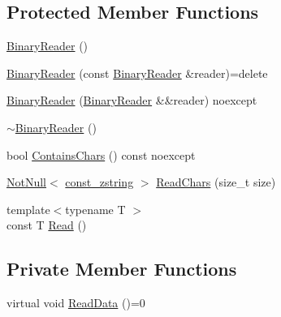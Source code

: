 \subsection*{Protected Member Functions}
\begin{DoxyCompactItemize}
\item 
\mbox{\hyperlink{classmage_1_1_binary_reader_aab82579cef4f2f022273cf1adfcc8497}{Binary\+Reader}} ()
\item 
\mbox{\hyperlink{classmage_1_1_binary_reader_a8c1ff948f1d056439f3d8cc37d7f507c}{Binary\+Reader}} (const \mbox{\hyperlink{classmage_1_1_binary_reader}{Binary\+Reader}} \&reader)=delete
\item 
\mbox{\hyperlink{classmage_1_1_binary_reader_a520841747b74b4b0e95f8d9b595492fa}{Binary\+Reader}} (\mbox{\hyperlink{classmage_1_1_binary_reader}{Binary\+Reader}} \&\&reader) noexcept
\item 
\mbox{\hyperlink{classmage_1_1_binary_reader_a42e6c31bc53f5214675f845756b5a404}{$\sim$\+Binary\+Reader}} ()
\item 
bool \mbox{\hyperlink{classmage_1_1_binary_reader_af68b85b30fbe8b5f2d4720163a658ab5}{Contains\+Chars}} () const noexcept
\item 
\mbox{\hyperlink{namespacemage_a8769f9d670d6b585ea306cb1062af94b}{Not\+Null}}$<$ \mbox{\hyperlink{namespacemage_abfd9206dc607ceb5d13ec68bf075a5c0}{const\+\_\+zstring}} $>$ \mbox{\hyperlink{classmage_1_1_binary_reader_ad2bed0756a38358fc4a8b10b02007af8}{Read\+Chars}} (size\+\_\+t size)
\item 
{\footnotesize template$<$typename T $>$ }\\const T \mbox{\hyperlink{classmage_1_1_binary_reader_aa99b02137069566c010692093b328a6a}{Read}} ()
\end{DoxyCompactItemize}
\subsection*{Private Member Functions}
\begin{DoxyCompactItemize}
\item 
virtual void \mbox{\hyperlink{classmage_1_1_binary_reader_a67157828a9781644fb55bd7f3558f07c}{Read\+Data}} ()=0
\end{DoxyCompactItemize}
